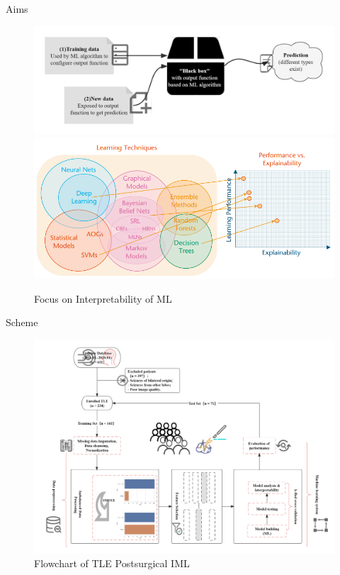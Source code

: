 \documentclass[
  11pt,
  ignorenonframetext,
  fontset=fandol]{beamer}
\begin{document}
\begin{frame}{Aims}
\protect\hypertarget{aims}{}
\begin{figure}

{\centering \includegraphics[width=0.7\linewidth]{images/Black-box} \includegraphics[width=0.8\linewidth]{images/xai} 

}

\caption{Focus on Interpretability of ML}\label{fig:unnamed-chunk-3}
\end{figure}
\end{frame}

\begin{frame}{Scheme}
\protect\hypertarget{scheme}{}
\begin{figure}

{\centering \includegraphics[width=0.85\linewidth]{images/TLE_EML_Flow} 

}

\caption{Flowchart of TLE Postsurgical IML}\label{fig:unnamed-chunk-4}
\end{figure}
\end{frame}
\end{document}
